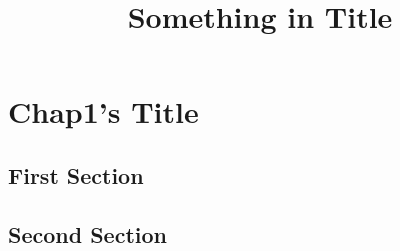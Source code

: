 \documentclass{article}
\begin{document}
\title{Something in Title}
\date{}
\maketitle
\else
\chapter{Chap1's Title}
\fi
\section{First Section}
\section{Second Section}
\ifx\allfiles\undefined
\end{document}
